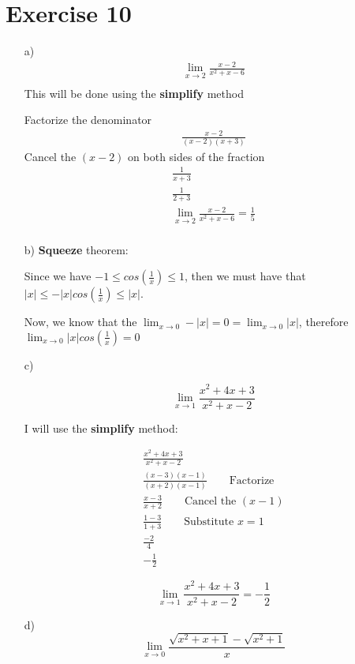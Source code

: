 \documentclass[11pt]{article}
\newcommand{\abs}[1]{\ensuremath{|#1| }}
\begin{document}
\section*{Exercise 10}
\label{sec:org48b59b0}
\begin{enumerate}
\item[a)]
\begin{gather*}
\lim_{x\to2} \frac{x-2}{x^{2}+x-6} \\
\end{gather*}
This will be done using the \textbf{simplify} method

Factorize the denominator
\begin{gather*}
\frac{x-2}{(x-2)(x+3)}
\end{gather*}
Cancel the \((x-2)\) on both sides of the fraction
\begin{gather*}
\frac{1}{x+3} \\
\frac{1}{2+3} \\
\lim_{x\to2} \frac{x-2}{x^{2}+x-6} = \frac{1}{5} \\
\end{gather*}
  \item[b)]
        \textbf{Squeeze} theorem:

        Since we have $-1 \le cos \left(\frac{1}{x}\right) \le 1 $, then we must have that $\abs{x} \le - \abs{x}cos \left(\frac{1}{x}\right) \le \abs{x}$.

        Now, we know that the $\lim_{x \rightarrow 0} - \abs{x} = 0 = \lim_{x \rightarrow 0} \abs{x}$,  therefore $\lim_{x \rightarrow 0} \abs{x} cos \left(\frac{1}{x}\right) = 0$

  \item[c)]

        \[
        \lim_{x\rightarrow 1}\frac{x^{2}+4x+3}{x^{2}+x-2}
        \]

        I will use the \textbf{simplify} method:

\begin{gather*}
  \frac{x^{2}+4x+3}{x^{2}+x-2} \\
  \frac{(x-3)(x-1)}{(x+2)(x-1)} \qquad \textrm{Factorize} \\
  \frac{x-3}{x+2} \qquad \textrm{Cancel the \((x-1)\)} \\
  \frac{1-3}{1+3} \qquad \textrm{Substitute \(x = 1\)} \\
  \frac{-2}{4} \\
  - \frac{1}{2}
\end{gather*}


        \[
        \lim_{x\rightarrow 1}\frac{x^{2}+4x+3}{x^{2}+x-2} = - \frac{1}{2}
        \]
  \item[d)]
        \[
  \lim_{x \rightarrow 0} \frac{\sqrt{x^{2}+x+1}-\sqrt{x^{2}+1}}{x}
        \]


\end{enumerate}
\end{document}
